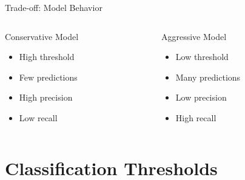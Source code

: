 \documentclass{beamer}
\begin{document}
\begin{frame}{Trade-off: Model Behavior}
\begin{columns}
\begin{column}{0.48\textwidth}
\begin{block}{Conservative Model}
\begin{itemize}
    \item High threshold
    \item Few predictions
    \item High precision
    \item Low recall
\end{itemize}
\end{block}
\end{column}

\begin{column}{0.48\textwidth}
\begin{block}{Aggressive Model}
\begin{itemize}
    \item Low threshold
    \item Many predictions
    \item Low precision
    \item High recall
\end{itemize}
\end{block}
\end{column}
\end{columns}
\end{frame}

\section{Classification Thresholds}
\end{document}

